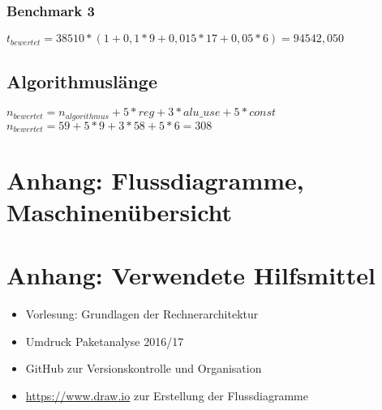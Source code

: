 \documentclass[12pt,titlepage,german,a4]{article}
\begin{document}
    \subsubsection{Benchmark 3}
    $t_{bewertet} = 38510 * (1 + 0,1*9 + 0,015*17 + 0,05*6) = 94542,050$

    \subsection{Algorithmusl{\"a}nge}
    $n_{bewertet} = n_{algorithmus} + 5* reg + 3*alu{\_}use + 5* const$\\
    $n_{bewertet} = 59+5*9+3*58+5*6 = 308$


    \newpage

    \section{Anhang: Flussdiagramme, Maschinen{\"u}bersicht}

    \newpage

    \section{Anhang: Verwendete Hilfsmittel}
	\begin{itemize}
		\item Vorlesung: Grundlagen der Rechnerarchitektur
		\item Umdruck Paketanalyse 2016/17
		\item GitHub zur Versionskontrolle und Organisation
		\item \url{https://www.draw.io} zur Erstellung der Flussdiagramme
	\end{itemize}
\end{document}
